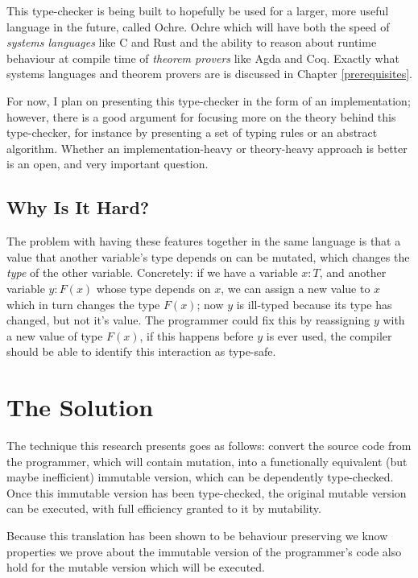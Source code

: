 \documentclass[12pt,twoside]{report}
\begin{document}
This type-checker is being built to hopefully be used for a larger, more useful language in the future, called Ochre. Ochre which will have both the speed of \textit{systems languages} like C and Rust and the ability to reason about runtime behaviour at compile time of \textit{theorem provers} like Agda and Coq. Exactly what systems languages and theorem provers are is discussed in Chapter \ref{prerequisites}.

For now, I plan on presenting this type-checker in the form of an implementation; however, there is a good argument for focusing more on the theory behind this type-checker, for instance by presenting a set of typing rules or an abstract algorithm. Whether an implementation-heavy or theory-heavy approach is better is an open, and very important question.

\subsection{Why Is It Hard?}
The problem with having these features together in the same language is that a value that another variable's type depends on can be mutated, which changes the \textit{type} of the other variable. Concretely: if we have a variable $x: T$, and another variable $y: F(x)$ whose type depends on $x$, we can assign a new value to $x$ which in turn changes the type $F(x)$; now $y$ is ill-typed because its type has changed, but not it's value. The programmer could fix this by reassigning $y$ with a new value of type $F(x)$, if this happens before $y$ is ever used, the compiler should be able to identify this interaction as type-safe.

\section{The Solution}
\label{thesolution}
The technique this research presents goes as follows: convert the source code from the programmer, which will contain mutation, into a functionally equivalent (but maybe inefficient) immutable version, which can be dependently type-checked. Once this immutable version has been type-checked, the original mutable version can be executed, with full efficiency granted to it by mutability.

Because this translation has been shown to be behaviour preserving\citep{ullrich_electrolysis_nodate} we know properties we prove about the immutable version of the programmer's code also hold for the mutable version which will be executed.
\end{document}
